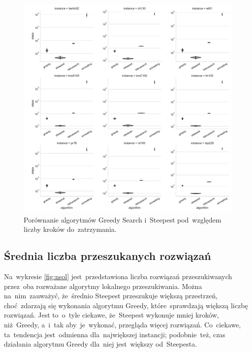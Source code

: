 \begin{figure}[H]
\begin{center}
\includegraphics[width=1.0\textwidth]{graphs/steps_comparison_violin.pdf}
\end{center}
\caption{Porównanie algorytmów Greedy Search i~Steepest pod~względem liczby kroków do~zatrzymania.}
\label{fig:steps}
\end{figure}

\subsection{Średnia liczba przeszukanych rozwiązań}

Na~wykresie \ref{fig:nsol} jest~przedstawiona liczba rozwiązań przeszukiwanych przez~oba rozważane algorytmy lokalnego przeszukiwania. Można na~nim~zauważyć, że~średnio Steepest przeszukuje większą przestrzeń, choć~zdarzają się wykonania algorytmu Greedy, które~sprawdzają większą liczbę rozwiązań. Jest to~o~tyle ciekawe, że~Steepest wykonuje mniej kroków, niż~Greedy, a~i~tak aby~je~wykonać, przegląda więcej rozwiązań. Co~ciekawe, ta~tendencja jest~odmienna dla~największej instancji; podobnie~też, czas działania algorytmu Greedy dla~niej jest~większy od~Steepesta.

